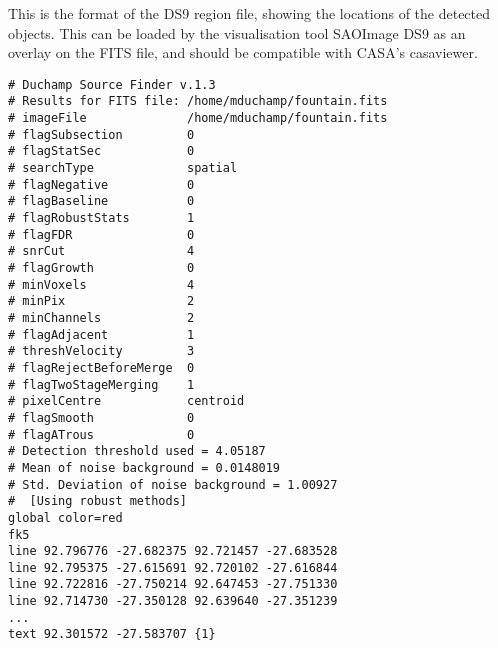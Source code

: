%
%
%
%
\label{app-ds9}

This is the format of the DS9 region file, showing the locations
of the detected objects. This can be loaded by the visualisation tool
SAOImage DS9 as an overlay on the FITS file, and should be compatible
with CASA's casaviewer.

\begin{verbatim}
# Duchamp Source Finder v.1.3
# Results for FITS file: /home/mduchamp/fountain.fits
# imageFile              /home/mduchamp/fountain.fits
# flagSubsection         0
# flagStatSec            0
# searchType             spatial
# flagNegative           0
# flagBaseline           0
# flagRobustStats        1
# flagFDR                0
# snrCut                 4
# flagGrowth             0
# minVoxels              4
# minPix                 2
# minChannels            2
# flagAdjacent           1
# threshVelocity         3
# flagRejectBeforeMerge  0
# flagTwoStageMerging    1
# pixelCentre            centroid
# flagSmooth             0
# flagATrous             0
# Detection threshold used = 4.05187
# Mean of noise background = 0.0148019
# Std. Deviation of noise background = 1.00927
#  [Using robust methods]
global color=red 
fk5
line 92.796776 -27.682375 92.721457 -27.683528
line 92.795375 -27.615691 92.720102 -27.616844
line 92.722816 -27.750214 92.647453 -27.751330
line 92.714730 -27.350128 92.639640 -27.351239
...
text 92.301572 -27.583707 {1}
\end{verbatim}

